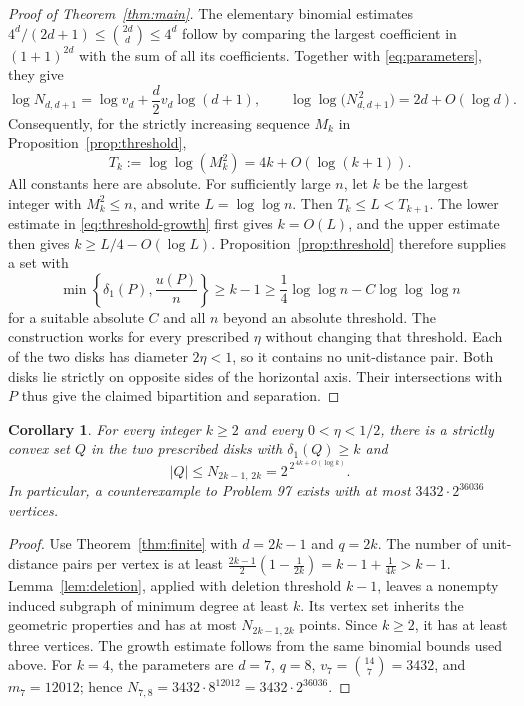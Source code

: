 \documentclass[a4paper,11pt]{amsart}
\newtheorem{corollary}[theorem]{Corollary}
\theoremstyle{remark}
\begin{document}
\begin{proof}[Proof of Theorem~\ref{thm:main}]
The elementary binomial estimates
$4^d/(2d+1)\le\binom{2d}{d}\le4^d$ follow by comparing the largest
coefficient in $(1+1)^{2d}$ with the sum of all its coefficients.
Together with \eqref{eq:parameters}, they give
\[
 \log N_{d,d+1}
 =\log v_d+\frac d2v_d\log(d+1),\qquad
 \log\log\bigl(N_{d,d+1}^{\,2}\bigr)=2d+O(\log d).
\]
Consequently, for the strictly increasing sequence $M_k$ in
Proposition~\ref{prop:threshold},
\begin{equation}\label{eq:threshold-growth}
 T_k:=\log\log(M_k^2)=4k+O(\log(k+1)).
\end{equation}
All constants here are absolute.
For sufficiently large $n$, let $k$ be the largest integer with
$M_k^2\le n$, and write $L=\log\log n$.
Then $T_k\le L<T_{k+1}$.
The lower estimate in \eqref{eq:threshold-growth} first gives
$k=O(L)$, and the upper estimate then gives
$k\ge L/4-O(\log L)$.
Proposition~\ref{prop:threshold} therefore supplies a set with
\[
 \min\left\{\delta_1(P),\frac{u(P)}n\right\}
 \ge k-1\ge\frac14\log\log n-C\log\log\log n
\]
for a suitable absolute $C$ and all $n$ beyond an absolute threshold.
The construction works for every prescribed $\eta$ without changing
that threshold.
Each of the two disks has diameter $2\eta<1$, so it contains no
unit-distance pair. Both disks lie strictly on opposite sides of the
horizontal axis. Their intersections with $P$ thus give the claimed
bipartition and separation.
\end{proof}

\begin{corollary}\label{cor:size}
For every integer $k\ge2$ and every $0<\eta<1/2$, there is a strictly
convex set $Q$ in the two prescribed disks with
$\delta_1(Q)\ge k$ and
\begin{equation}\label{eq:size}
 |Q|\le N_{2k-1,\,2k}=2^{\,2^{\,4k+O(\log k)}}.
\end{equation}
In particular, a counterexample to Problem 97 exists with at most
$3432\cdot2^{36036}$ vertices.
\end{corollary}

\begin{proof}
Use Theorem~\ref{thm:finite} with $d=2k-1$ and $q=2k$.
The number of unit-distance pairs per vertex is at least
$\frac{2k-1}{2}(1-\frac1{2k})=k-1+\frac1{4k}>k-1$.
Lemma~\ref{lem:deletion}, applied with deletion threshold $k-1$, leaves
a nonempty induced subgraph of minimum degree at least $k$.
Its vertex set inherits the geometric properties and has at most
$N_{2k-1,2k}$ points. Since $k\ge2$, it has at least three vertices.
The growth estimate follows from the same binomial bounds used above.
For $k=4$, the parameters are $d=7$, $q=8$,
$v_7=\binom{14}{7}=3432$, and $m_7=12012$; hence
$N_{7,8}=3432\cdot8^{12012}=3432\cdot2^{36036}$.
\end{proof}
\end{document}
